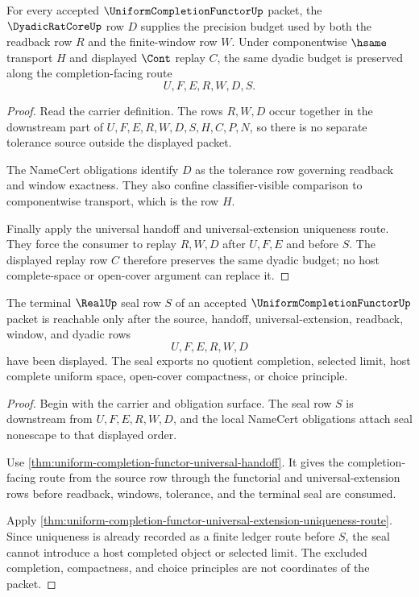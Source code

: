 \begin{theorem}
\label{thm:uniform-completion-functor-dyadic-window-stability}
For every accepted $\UniformCompletionFunctorUp$ packet, the $\DyadicRatCoreUp$ row $D$ supplies the precision budget used by both the readback row $R$ and the finite-window row $W$. Under componentwise $\hsame$ transport $H$ and displayed $\Cont$ replay $C$, the same dyadic budget is preserved along the completion-facing route
$$
U,F,E,R,W,D,S .
$$
\end{theorem}
\begin{proof}
Read the carrier definition. The rows $R,W,D$ occur together in the downstream part of $U,F,E,R,W,D,S,H,C,P,N$, so there is no separate tolerance source outside the displayed packet.

The NameCert obligations identify $D$ as the tolerance row governing readback and window exactness. They also confine classifier-visible comparison to componentwise transport, which is the row $H$.

Finally apply the universal handoff and universal-extension uniqueness route. They force the consumer to replay $R,W,D$ after $U,F,E$ and before $S$. The displayed replay row $C$ therefore preserves the same dyadic budget; no host complete-space or open-cover argument can replace it.
\end{proof}

\begin{theorem}
\label{thm:uniform-completion-functor-real-seal-nonescape}
The terminal $\RealUp$ seal row $S$ of an accepted $\UniformCompletionFunctorUp$ packet is reachable only after the source, handoff, universal-extension, readback, window, and dyadic rows
$$
U,F,E,R,W,D
$$
have been displayed. The seal exports no quotient completion, selected limit, host complete uniform space, open-cover compactness, or choice principle.
\end{theorem}
\begin{proof}
Begin with the carrier and obligation surface. The seal row $S$ is downstream from $U,F,E,R,W,D$, and the local NameCert obligations attach seal nonescape to that displayed order.

Use \autoref{thm:uniform-completion-functor-universal-handoff}. It gives the completion-facing route from the source row through the functorial and universal-extension rows before readback, windows, tolerance, and the terminal seal are consumed.

Apply \autoref{thm:uniform-completion-functor-universal-extension-uniqueness-route}. Since uniqueness is already recorded as a finite ledger route before $S$, the seal cannot introduce a host completed object or selected limit. The excluded completion, compactness, and choice principles are not coordinates of the packet.
\end{proof}

